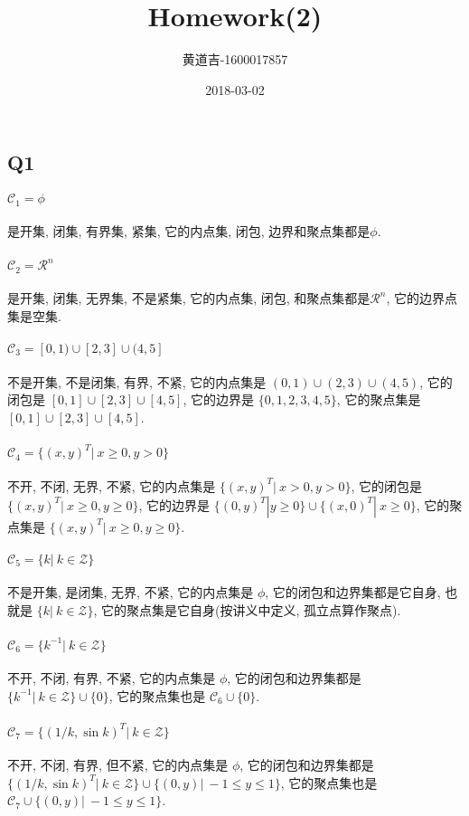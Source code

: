 \documentclass{article}
\title{Homework(2)}
\date{2018-03-02}
\author{
  \begin{CJK}{UTF8}{gbsn}
    黄道吉-1600017857
  \end{CJK}
}
\begin{document}
\begin{CJK}{UTF8}{gbsn}
\section{Q1}
  \paragraph{$\mathcal{C}_1 = \phi$}
    是开集, 闭集, 有界集, 紧集, 它的内点集, 闭包, 边界和聚点集都是$\phi$.
  \paragraph{$\mathcal{C}_2 = \mathcal{R}^n$}
    是开集, 闭集, 无界集, 不是紧集, 它的内点集, 闭包, 和聚点集都是$\mathcal{R}^n$, 它的边界点集是空集.
  \paragraph{$\mathcal{C}_3 = [0, 1) \cup [2, 3] \cup (4, 5]$}
    不是开集, 不是闭集, 有界, 不紧, 它的内点集是 $(0, 1) \cup (2, 3) \cup (4, 5)$, 它的闭包是 $[0, 1] \cup [2, 3] \cup [4, 5]$, 它的边界是 $\{0, 1, 2, 3, 4, 5\}$, 它的聚点集是 $[0, 1] \cup [2, 3] \cup [4, 5]$.
  \paragraph{$\mathcal{C}_4 = \{(x, y)^T |\  x \geq 0, y > 0\}$}
    不开, 不闭, 无界, 不紧, 它的内点集是 $\{(x, y)^T|\ x > 0, y > 0\}$, 它的闭包是 $\{(x, y)^T|\ x \ge 0, y \ge 0\}$, 它的边界是 $\{(0, y)^T|y \ge 0 \} \cup \{(x, 0)^T|\ x \ge 0\}$, 它的聚点集是 $\{(x, y)^T|\ x \ge 0, y \ge 0\}$.
  \paragraph{$\mathcal{C}_5 = \{k|\ k \in \mathcal{Z}\}$}
    不是开集, 是闭集, 无界, 不紧, 它的内点集是 $\phi$, 它的闭包和边界集都是它自身, 也就是 $\{k|\ k \in \mathcal{Z}\}$, 它的聚点集是它自身(按讲义中定义, 孤立点算作聚点).
  \paragraph{$\mathcal{C}_6 = \{k^{-1}|\ k \in \mathcal{Z}\}$}
    不开, 不闭, 有界, 不紧, 它的内点集是 $\phi$, 它的闭包和边界集都是 $\{k^{-1}|\ k \in \mathcal{Z}\} \cup \{0\}$, 它的聚点集也是 $\mathcal{C}_6 \cup \{0\}$.
  \paragraph{$\mathcal{C}_7 = \{(1 / k, \sin{k})^T|\ k \in \mathcal{Z}\}$}
    不开, 不闭, 有界, 但不紧, 它的内点集是 $\phi$, 它的闭包和边界集都是 $\{(1 / k, \sin{k})^T|\ k \in \mathcal{Z}\} \cup \{(0, y)|\ -1 \leq y \leq 1\}$, 它的聚点集也是 $\mathcal{C}_7 \cup \{(0, y)|\ -1 \leq y \leq 1\}$.


\end{CJK}
\end{document}
